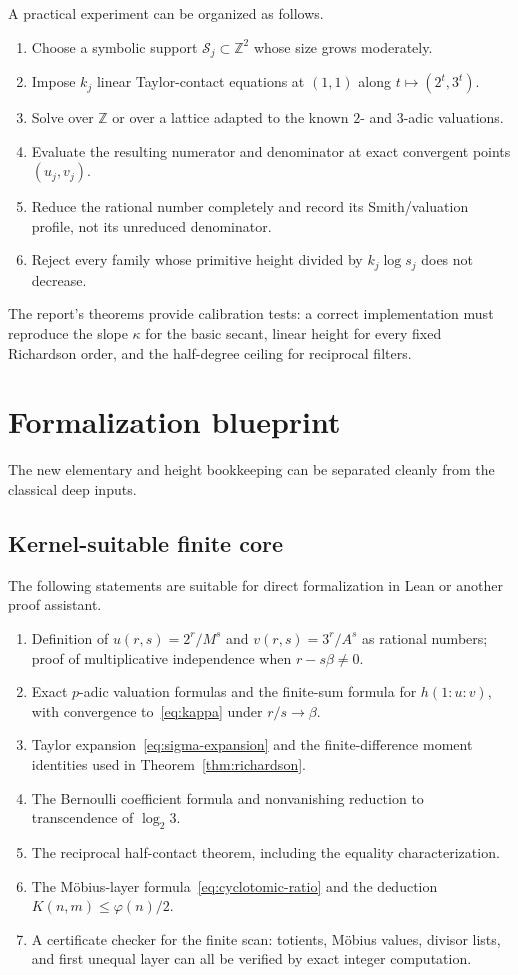 \documentclass[11pt,oneside]{article}
\theoremstyle{definition}
\theoremstyle{remark}
\newcommand{\Z}{\mathbb Z}
\begin{document}
A practical experiment can be organized as follows.

\begin{enumerate}
\item Choose a symbolic support $\mathcal S_j\subset\Z^2$ whose size grows moderately.
\item Impose $k_j$ linear Taylor-contact equations at $(1,1)$ along
$t\mapsto(2^t,3^t)$.
\item Solve over $\Z$ or over a lattice adapted to the known $2$- and $3$-adic valuations.
\item Evaluate the resulting numerator and denominator at exact convergent points
$(u_j,v_j)$.
\item Reduce the rational number completely and record its Smith/valuation profile, not its
unreduced denominator.
\item Reject every family whose primitive height divided by $k_j\log s_j$ does not decrease.
\end{enumerate}

The report's theorems provide calibration tests: a correct implementation must reproduce the
slope $\kappa$ for the basic secant, linear height for every fixed Richardson order, and the
half-degree ceiling for reciprocal filters.

\section{Formalization blueprint}
\label{sec:lean}

The new elementary and height bookkeeping can be separated cleanly from the classical deep
inputs.

\subsection{Kernel-suitable finite core}

The following statements are suitable for direct formalization in Lean or another proof
assistant.

\begin{enumerate}
\item Definition of $u(r,s)=2^r/M^s$ and $v(r,s)=3^r/A^s$ as rational numbers; proof of
multiplicative independence when $r-s\beta\ne0$.
\item Exact $p$-adic valuation formulas and the finite-sum formula for
$h(1:u:v)$, with convergence to~\eqref{eq:kappa} under $r/s\to\beta$.
\item Taylor expansion~\eqref{eq:sigma-expansion} and the finite-difference moment identities
used in Theorem~\ref{thm:richardson}.
\item The Bernoulli coefficient formula and nonvanishing reduction to transcendence of
$\log_2 3$.
\item The reciprocal half-contact theorem, including the equality characterization.
\item The M\"obius-layer formula~\eqref{eq:cyclotomic-ratio} and the deduction
$K(n,m)\le\varphi(n)/2$.
\item A certificate checker for the finite scan: totients, M\"obius values, divisor lists,
and first unequal layer can all be verified by exact integer computation.
\end{enumerate}
\end{document}
